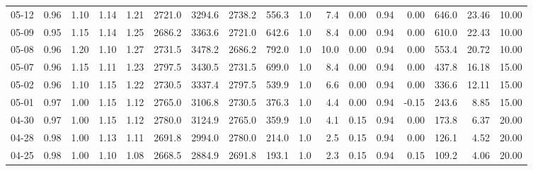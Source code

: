 \begin{threeparttable}
{\begin{tabular}{lrrrrrrrrrrrrrrrr}
  05-12 &         0.96 &           1.10 &          1.14 &          1.21 & 2721.0 & 3294.6 & 2738.2 &      556.3 &                      1.0 &                 7.4 &       0.00 &      0.94 &           0.00 &            646.0 &           23.46 &                  10.00 \\
  05-09 &         0.95 &           1.15 &          1.14 &          1.25 & 2686.2 & 3363.6 & 2721.0 &      642.6 &                      1.0 &                 8.4 &       0.00 &      0.94 &           0.00 &            610.0 &           22.43 &                  10.00 \\
  05-08 &         0.96 &           1.20 &          1.10 &          1.27 & 2731.5 & 3478.2 & 2686.2 &      792.0 &                      1.0 &                10.0 &       0.00 &      0.94 &           0.00 &            553.4 &           20.72 &                  10.00 \\
  05-07 &         0.96 &           1.15 &          1.11 &          1.23 & 2797.5 & 3430.5 & 2731.5 &      699.0 &                      1.0 &                 8.4 &       0.00 &      0.94 &           0.00 &            437.8 &           16.18 &                  15.00 \\
  05-02 &         0.96 &           1.10 &          1.15 &          1.22 & 2730.5 & 3337.4 & 2797.5 &      539.9 &                      1.0 &                 6.6 &       0.00 &      0.94 &           0.00 &            336.6 &           12.11 &                  15.00 \\
  05-01 &         0.97 &           1.00 &          1.15 &          1.12 & 2765.0 & 3106.8 & 2730.5 &      376.3 &                      1.0 &                 4.4 &       0.00 &      0.94 &          -0.15 &            243.6 &            8.85 &                  15.00 \\
  04-30 &         0.97 &           1.00 &          1.15 &          1.12 & 2780.0 & 3124.9 & 2765.0 &      359.9 &                      1.0 &                 4.1 &       0.15 &      0.94 &           0.00 &            173.8 &            6.37 &                  20.00 \\
  04-28 &         0.98 &           1.00 &          1.13 &          1.11 & 2691.8 & 2994.0 & 2780.0 &      214.0 &                      1.0 &                 2.5 &       0.15 &      0.94 &           0.00 &            126.1 &            4.52 &                  20.00 \\
  04-25 &         0.98 &           1.00 &          1.10 &          1.08 & 2668.5 & 2884.9 & 2691.8 &      193.1 &                      1.0 &                 2.3 &       0.15 &      0.94 &           0.15 &            109.2 &            4.06 &                  20.00 \\

\end{tabular}}
\end{threeparttable}
